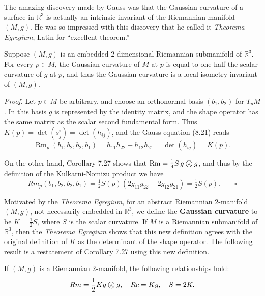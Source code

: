 The amazing discovery made by Gauss was that the Gaussian curvature of a surface in $\mathbb{R}^3$ is actually an intrinsic invariant of the Riemannian manifold $(M,g)$. He was so impressed with this discovery that he called it \emph{Theorema Egregium}, Latin for ``excellent theorem.''

\begin{theorem}
\label{thm:theorema-egregium}
Suppose $(M,g)$ is an embedded 2-dimensional Riemannian submanifold of $\mathbb{R}^3$. For every $p \in M$, the Gaussian curvature of $M$ at $p$ is equal to one-half the scalar curvature of $g$ at $p$, and thus the Gaussian curvature is a local isometry invariant of $(M,g)$.
\end{theorem}

\emph{Proof.} Let $p \in M$ be arbitrary, and choose an orthonormal basis $(b_1, b_2)$ for $T_p M$. In this basis $g$ is represented by the identity matrix, and the shape operator has the same matrix as the scalar second fundamental form. Thus $K(p) = \det(s^i_j) = \det(h_{ij})$, and the Gauss equation (8.21) reads
\[
\operatorname{Rm}_p(b_1, b_2, b_2, b_1) = h_{11}h_{22} - h_{12}h_{21} = \det(h_{ij}) = K(p).
\]

On the other hand, Corollary 7.27 shows that $\operatorname{Rm} = \frac{1}{4}S\, g \owedge g$, and thus by the definition of the Kulkarni-Nomizu product we have
\[
Rm_p(b_1, b_2, b_2, b_1) = \tfrac{1}{2}S(p)(2g_{11}g_{22} - 2g_{12}g_{21}) = \tfrac{1}{2}S(p). \qquad\square
\]


Motivated by the \emph{Theorema Egregium}, for an abstract Riemannian 2-manifold $(M,g)$, not necessarily embedded in $\mathbb{R}^3$, we define the \textbf{Gaussian curvature} to be $K = \frac{1}{2}S$, where $S$ is the scalar curvature. If $M$ is a Riemannian submanifold of $\mathbb{R}^3$, then the \emph{Theorema Egregium} shows that this new definition agrees with the original definition of $K$ as the determinant of the shape operator. The following result is a restatement of Corollary 7.27 using this new definition.

\begin{corollary}
\label{cor:riemann-two-manifold-curvatures}
If $(M, g)$ is a Riemannian 2-manifold, the following relationships hold:
\[
Rm = \frac{1}{2}K g \owedge g, \quad Rc = Kg, \quad S = 2K.
\]
\end{corollary}

